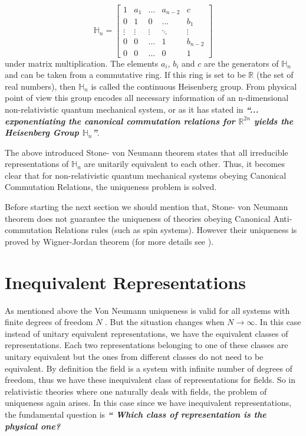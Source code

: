 \documentclass[12pt]{article}
\begin{document}
\[
\mathbb{H}_n
=
\begin{bmatrix}
    1 & a_1 &  \dots  & a_{n-2} & c \\
    0 & 1 &0 & \dots  & b_1 \\
    \vdots & \vdots & \vdots & \ddots & \vdots \\
    0 & 0  & \dots & 1  & b_{n-2} \\
    0 & 0 &  \dots & 0 &1
\end{bmatrix}
\]
under matrix multiplication. The elements $a_i$, $b_i$ and $c$ are the generators of $\mathbb{H}_n$ and can be taken from a commutative ring. If this ring is set to be $\mathbb{R}$ (the set of real numbers), then $\mathbb{H}_n$ is called the continuous Heisenberg group. From physical point of view this group encodes all necessary information of an n-dimensional non-relativistic quantum mechanical system, or as it has stated in \cite{Laura} \emph{\textbf{``... exponentiating the canonical commutation relations for \emph{\textbf{$\mathbb{R}^{2n}$}} yields the Heisenberg Group $\mathbb{H}_n$''}}.

The above introduced Stone- von Neumann theorem states that all irreducible representations of  $\mathbb{H}_n$ are unitarily equivalent to each other. Thus, it becomes clear that for non-relativistic quantum mechanical systems obeying Canonical Commutation Relations, the uniqueness problem is solved.

Before starting the next section we should mention that, Stone- von Neumann theorem does not guarantee the uniqueness of theories obeying Canonical Anti-commutation Relations rules (such as spin systems). However their uniqueness is proved by Wigner-Jordan theorem \cite{Jordan} (for more details see \cite{Laura}).

\section{Inequivalent Representations}\label{UIR}
As mentioned above the Von Neumann uniqueness is valid for all systems with finite degrees of freedom $N$ \cite{Haag}. But the situation changes when $N\rightarrow\infty$. In this case instead of unitary equivalent representations, we have the equivalent classes of representations. Each two representations belonging to one of these classes are unitary equivalent but the ones from different classes do not need to be equivalent. By definition the field is a system with infinite number of degrees of freedom, thus we have these inequivalent class of representations for fields. So in relativistic theories where one naturally deals with fields, the problem of uniqueness again arises. In this case since we have inequivalent representations, the fundamental question is \emph{\textbf{`` Which class of representation is the physical one?}}
\end{document}
